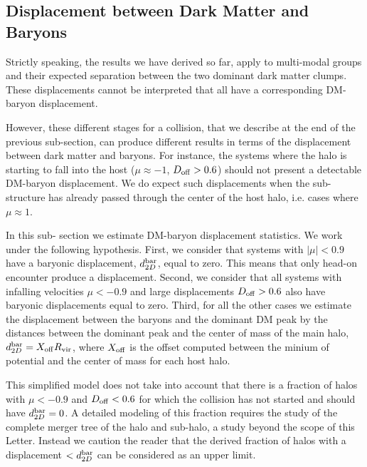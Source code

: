 \documentclass{emulateapj}
\begin{document}
\subsection{Displacement between Dark Matter and Baryons}
\label{sec:baryonic_displacements}



Strictly speaking, the results we have derived so far, apply to multi-modal
groups and their expected separation between the two dominant dark
matter clumps. These displacements cannot be interpreted that all have a
corresponding DM-baryon displacement. 


However, these different stages for a collision, that we describe at
the end of the previous sub-section, can produce different results in
terms of the displacement between dark matter and baryons. For
instance, the systems where the halo is starting to fall into the host
($\mu\approx-1$, $D_{\rm off}>0.6$) should not present a detectable
DM-baryon displacement.  We do expect such displacements when the
sub-structure has already passed through the center of the host halo,
i.e. cases where $\mu\approx 1$. 

In this sub- section we estimate DM-baryon displacement statistics. We
work under the following hypothesis. First, we consider that systems
with $|\mu|<0.9$ have a baryonic displacement, $d_{2D}^{\rm bar}$,
equal to zero. This means that only head-on encounter produce a
displacement. Second, we consider that all systems with infalling
velocities $\mu<-0.9$ and large displacements $D_{\rm off}>0.6$ also
have baryonic displacements equal to zero. Third, for all the other
cases we estimate the displacement between the baryons and the
dominant DM peak by the distances between the dominant peak and the
center of mass of the main halo, $d_{2D}^{\rm bar} = X_{\rm off} R_{\rm
  vir}$, where $X_{\rm off}$ is the offset computed between the minium
of potential and the center of mass for each host halo.


This simplified model does not take into account that there is a
fraction of halos with $\mu<-0.9$ and $D_{\rm off}<0.6$ for which the
collision has not started and should have $d_{2D}^{\rm bar}=0$. A detailed
modeling of this fraction requires the study of the complete merger
tree of the halo and sub-halo, a study beyond the scope of this
Letter. Instead we caution the reader that the derived fraction of
halos with a displacement $<d_{2D}^{\rm bar}$ can be considered as an
upper limit. 
\end{document}
